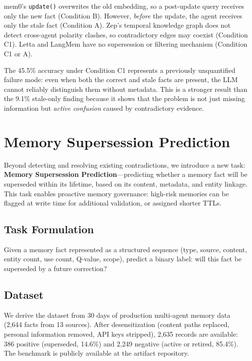 \documentclass{article}
\begin{document}
mem0's \texttt{update()} overwrites the old embedding, so a post-update query receives only the new fact (Condition B). However, \emph{before} the update, the agent receives only the stale fact (Condition A). Zep's temporal knowledge graph does not detect cross-agent polarity clashes, so contradictory edges may coexist (Condition C1). Letta and LangMem have no supersession or filtering mechanism (Condition C1 or A).

The 45.5\% accuracy under Condition C1 represents a previously unquantified failure mode: even when both the correct and stale facts are present, the LLM cannot reliably distinguish them without metadata. This is a stronger result than the 9.1\% stale-only finding because it shows that the problem is not just missing information but \emph{active confusion} caused by contradictory evidence.

\section{Memory Supersession Prediction}
\label{sec:supersession_pred}

Beyond detecting and resolving existing contradictions, we introduce a new task: \textbf{Memory Supersession Prediction}---predicting whether a memory fact will be superseded within its lifetime, based on its content, metadata, and entity linkage. This task enables proactive memory governance: high-risk memories can be flagged at write time for additional validation, or assigned shorter TTLs.

\subsection{Task Formulation}

Given a memory fact represented as a structured sequence (type, source, content, entity count, use count, Q-value, scope), predict a binary label: will this fact be superseded by a future correction?

\subsection{Dataset}

We derive the dataset from 30 days of production multi-agent memory data (2{,}644 facts from 13 sources). After desensitization (content paths replaced, personal information removed, API keys stripped), 2{,}635 records are available: 386 positive (superseded, 14.6\%) and 2{,}249 negative (active or retired, 85.4\%). The benchmark is publicly available at the artifact repository.
\end{document}
